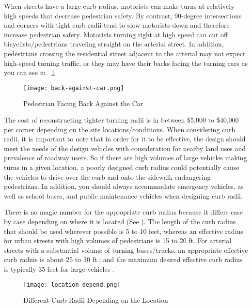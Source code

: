         When streets have a large curb radius, motorists can make turns at relatively high speeds that decrease pedestrian safety. By contrast, 90-degree intersections and corners with tight curb radii tend to slow motorists down and therefore increase pedestrian safety. Motorists turning right at high speed can cut off bicyclists/pedestrians traveling straight on the arterial street. In addition, pedestrians crossing the residential street adjacent to the arterial may not expect high-speed turning traffic, or they may have their backs facing the turning cars as you can see in ~\ref{fig:back-against-car}

\begin{figure}
\centering
	\texttt{[image: back-against-car.png]}
	\caption{Pedestrian Facing Back Against the Car}\label{fig:back-against-car}
\end{figure}

The cost of reconstructing tighter turning radii is in between \$5,000 to \$40,000 per corner depending on the site locations/conditions. When considering curb radii, it is important to note that in order for it to be effective, the design should meet the needs of the design vehicles with consideration for nearby land uses and prevalence of roadway users. So if there are high volumes of large vehicles making turns in a given location, a poorly designed curb radius could potentially cause the vehicles to drive over the curb and onto the sidewalk endangering pedestrians. In addition, you should always accommodate emergency vehicles, as well as school buses, and public maintenance vehicles when designing curb radii\cite{walking-info-curb}.


There is no magic number for the appropriate curb radius because it differs case by case depending on where it is located (See ). The length of the curb radius that should be used wherever possible is 5 to 10 feet, whereas an effective radius for urban streets with high volumes of pedestrians is 15 to 20 ft. For arterial streets with a substantial volume of turning buses/trucks, an appropriate effective curb radius is about 25 to 30 ft.; and the maximum desired effective curb radius is typically 35 feet for large vehicles \cite{walking-info-curb}.

\begin{figure}
\centering
	\texttt{[image: location-depend.png]}
	\caption{Different Curb Radii Depending on the Location}\label{fig:location-depend}
\end{figure}